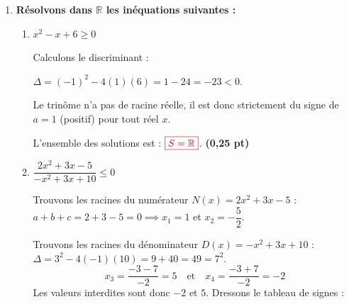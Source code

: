 \documentclass[12pt,a4paper]{article}
\newcommand{\redtitle}[1]{\textcolor{myred}{\textbf{#1}}}
\newcommand{\redbox}[1]{\color{myred}\boxed{#1}\color{black}}
\begin{document}
\begin{enumerate}
\begin{enumerate}
\begin{itemize}
            $\Delta = (-3)^2 - 4(1)(1) = 9 - 4 = 5$.
            \[ x_1 = \dfrac{3 - \sqrt{5}}{2} \quad \text{et} \quad x_2 = \dfrac{3 + \sqrt{5}}{2} \]
        \end{itemize}
        L'ensemble des solutions est : 
        
        $\redbox{S = \left\{\dfrac{3 - \sqrt{5}}{2} \,;~ \dfrac{3 + \sqrt{5}}{2}\right\}}$. \hfill \textbf{(0,75 pt)}
    \end{enumerate}

    \item \redtitle{Résolvons dans $\mathbb{R}$ les inéquations suivantes :}
    
    \begin{enumerate}
        \item $x^2 - x + 6 \geq 0$
        
        Calculons le discriminant : 
        
        $\Delta = (-1)^2 - 4(1)(6) = 1 - 24 = -23 < 0$.
        
        Le trinôme n'a pas de racine réelle, il est donc strictement du signe de $a=1$ (positif) pour tout réel $x$.
        
        L'ensemble des solutions est : $\redbox{S = \mathbb{R}}$. \hfill \textbf{(0,25 pt)}
        
        \item $\dfrac{2x^2 + 3x - 5}{-x^2 + 3x + 10} \leq 0$
        
        Trouvons les racines du numérateur $N(x) = 2x^2 + 3x - 5$ :
        $a+b+c = 2+3-5=0 \implies x_1 = 1$ et $x_2 = -\dfrac{5}{2}$.
        
        Trouvons les racines du dénominateur $D(x) = -x^2 + 3x + 10$ :
        $\Delta = 3^2 - 4(-1)(10) = 9 + 40 = 49 = 7^2$.
        \[ x_3 = \dfrac{-3 - 7}{-2} = 5 \quad \text{et} \quad x_4 = \dfrac{-3 + 7}{-2} = -2 \]
        Les valeurs interdites sont donc $-2$ et $5$. Dressons le tableau de signes :
        
        \begin{center}
        \end{center}
        

\end{enumerate}
\end{enumerate}
\end{document}
